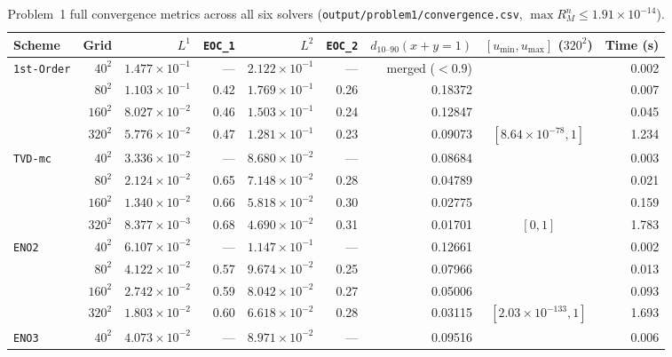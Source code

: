 \documentclass[11pt,a4paper]{article}
\newcommand{\code}[1]{\texttt{#1}}
\theoremstyle{definition}
\begin{document}
\begin{table}[h]
\centering\scriptsize\setlength{\tabcolsep}{4.0pt}\renewcommand{\arraystretch}{0.95}
\caption{Problem~1 full convergence metrics across all six solvers (\code{output/problem1/convergence.csv}, $\max R_M^n \le 1.91\times 10^{-14}$).}
\label{tab:p1}
\begin{tabular}{@{}lrrrrrrcr@{}}
\toprule
\textbf{Scheme} & \textbf{Grid} & $L^1$ & \code{EOC\_1} & $L^2$ & \code{EOC\_2} & $d_{10\text{--}90}(x+y=1)$ & $[u_{\min}, u_{\max}]$ ($320^2$) & \textbf{Time (s)} \\
\midrule
\code{1st-Order} & $40^2$  & $1.477\times 10^{-1}$ & ---  & $2.122\times 10^{-1}$ & ---  & merged ($<0.9$) & & 0.002 \\
                 & $80^2$  & $1.103\times 10^{-1}$ & 0.42 & $1.769\times 10^{-1}$ & 0.26 & 0.18372 & & 0.007 \\
                 & $160^2$ & $8.027\times 10^{-2}$ & 0.46 & $1.503\times 10^{-1}$ & 0.24 & 0.12847 & & 0.045 \\
                 & $320^2$ & $5.776\times 10^{-2}$ & 0.47 & $1.281\times 10^{-1}$ & 0.23 & 0.09073 & $[8.64\times 10^{-78}, 1]$ & 1.234 \\
\midrule
\code{TVD-mc}    & $40^2$  & $3.336\times 10^{-2}$ & ---  & $8.680\times 10^{-2}$ & ---  & 0.08684 & & 0.003 \\
                 & $80^2$  & $2.124\times 10^{-2}$ & 0.65 & $7.148\times 10^{-2}$ & 0.28 & 0.04789 & & 0.021 \\
                 & $160^2$ & $1.340\times 10^{-2}$ & 0.66 & $5.818\times 10^{-2}$ & 0.30 & 0.02775 & & 0.159 \\
                 & $320^2$ & $8.377\times 10^{-3}$ & 0.68 & $4.690\times 10^{-2}$ & 0.31 & 0.01701 & $[0, 1]$ & 1.783 \\
\midrule
\code{ENO2}      & $40^2$  & $6.107\times 10^{-2}$ & ---  & $1.147\times 10^{-1}$ & ---  & 0.12661 & & 0.002 \\
                 & $80^2$  & $4.122\times 10^{-2}$ & 0.57 & $9.674\times 10^{-2}$ & 0.25 & 0.07966 & & 0.013 \\
                 & $160^2$ & $2.742\times 10^{-2}$ & 0.59 & $8.042\times 10^{-2}$ & 0.27 & 0.05006 & & 0.093 \\
                 & $320^2$ & $1.803\times 10^{-2}$ & 0.60 & $6.618\times 10^{-2}$ & 0.28 & 0.03115 & $[2.03\times 10^{-133}, 1]$ & 1.693 \\
\midrule
\code{ENO3}      & $40^2$  & $4.073\times 10^{-2}$ & ---  & $8.971\times 10^{-2}$ & ---  & 0.09516 & & 0.006 \\

\end{tabular}
\end{table}
\end{document}
